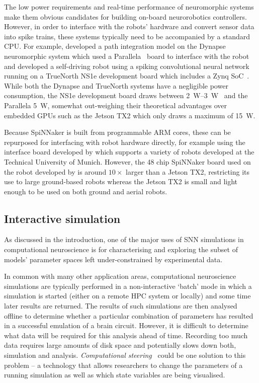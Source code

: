 \documentclass[utf8]{frontiersSCNS} %
\begin{document}
The low power requirements and real-time performance of neuromorphic systems make them obvious candidates for building on-board neurorobotics controllers.
However, in order to interface with the robots' hardware and convert sensor data into spike trains, these systems typically need to be accompanied by a standard CPU.
For example, \citet{Kreiser2018} developed a path integration model on the Dynapse~\citep{Qiao2015} neuromorphic system which used a Parallela~\citep{Olofsson2015} board to interface with the robot and \citet{Hwu2017} developed a self-driving robot using a spiking convolutional neural network running on a TrueNorth NS1e development board which includes a Zynq SoC~\citep{XilinxInc2018}.
While both the Dynapse and TrueNorth systems have a negligible power consumption, the NS1e development board draws between \SIrange{2}{3}{\watt}~\citep{Sawada2016} and the Parallela \SI{5}{\watt}, somewhat out-weighing their theoretical advantages over embedded GPUs such as the Jetson TX2 which only draws a maximum of \SI{15}{\watt}.

Because SpiNNaker is built from programmable ARM cores, these can be repurposed for interfacing with robot hardware directly, for example using the interface board developed by \citet{Denk2013} which supports a variety of robots developed at the Technical University of Munich.
However, the 48 chip SpiNNaker board used on the robot developed by \citet{Conradt2015} is around $10\times$ larger than a Jetson TX2, restricting its use to large ground-based robots whereas the Jetson TX2 is small and light enough to be used on both ground and aerial robots.

\subsection{Interactive simulation}
As discussed in the introduction, one of the major uses of SNN simulations in computational neuroscience is for characterising and exploring the subset of models' parameter spaces left under-constrained by experimental data.

In common with many other application areas, computational neuroscience simulations are typically performed in a non-interactive `batch' mode in which a simulation is started (either on a remote HPC system or locally) and some time later results are returned.
The results of such simulations are then analysed offline to determine whether a particular combination of parameters has resulted in a successful emulation of a brain circuit.
However, it is difficult to determine what data will be required for this analysis ahead of time.
Recording too much data requires large amounts of disk space and potentially slows down both, simulation and analysis.
\textit{Computational steering}~\citep{Parker1997} could be one solution to this problem -- a technology that allows researchers to change the parameters of a running simulation as well as which state variables are being visualised.
\end{document}
